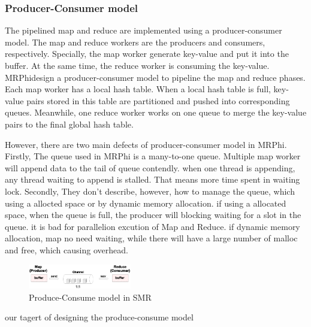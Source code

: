 

\subsubsection{Producer-Consumer model}
The pipelined map and reduce are implemented using a
producer-consumer model. 
The map and reduce workers are the producers and consumers, respectively.
Specially, the map worker generate key-value and 
put it into the buffer.
At the same time, 
the reduce worker is consuming the key-value.
MRPhi\cite{lu2013mrphi}design a producer-consumer model 
to pipeline the map and reduce phases. 
Each map worker has a local hash table. 
When a local hash table is full,
key-value pairs stored in this table are partitioned and
pushed into corresponding queues. 
Meanwhile, one reduce
worker works on one queue to merge the key-value pairs to
the final global hash table.


However, there are two main defects of producer-consumer model in MRPhi.
Firstly, The queue used in MRPhi is a many-to-one queue.
Multiple map worker will append data to the tail of queue {\color{gray}contendly}. 
when one thread is appending, any thread waiting to append is stalled.
That means more time spent in waiting lock.
Secondly, They don’t describe, however, how to manage the queue,
which using a allocted space or by dynamic memory allocation.
if using a allocated space, when the queue is full, 
the producer will blocking waiting for a slot in the queue.
it is bad for parallelion excution of Map and Reduce.
if dynamic memory allocation, 
map no need waiting, while there will have a large number of malloc and free,
which causing overhead.

\begin{figure}[!h!t]  
    \centering
    \includegraphics[width=0.4\textwidth]{eps/dmr_channel.eps}
    \caption{Produce-Consume model in SMR}
    \label{fig:dmr:pc-model}
\end{figure}
{\color{red} our tagert of designing the produce-consume model}\\

